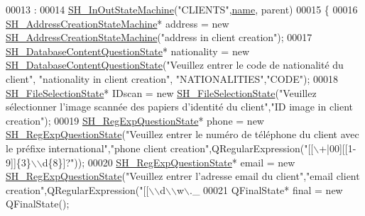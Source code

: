 \begin{DoxyCode}
00013                                                                                           :
00014     \hyperlink{classSH__InOutStateMachine_abd780037922920c674b43d80c2b50d16}{SH\_InOutStateMachine}(\textcolor{stringliteral}{"CLIENTS"},\hyperlink{classSH__NamedObject_a9f686c6f2a5bcc08ad03d0cee0151f0f}{name}, parent)
00015 \{
00016     \hyperlink{classSH__AddressCreationStateMachine}{SH\_AddressCreationStateMachine}* address = \textcolor{keyword}{new} 
      \hyperlink{classSH__AddressCreationStateMachine}{SH\_AddressCreationStateMachine}(\textcolor{stringliteral}{"address in client creation"});
00017     \hyperlink{classSH__DatabaseContentQuestionState}{SH\_DatabaseContentQuestionState}* nationality = \textcolor{keyword}{new} 
      \hyperlink{classSH__DatabaseContentQuestionState}{SH\_DatabaseContentQuestionState}(\textcolor{stringliteral}{"Veuillez entrer le code de nationalité du
       client"}, \textcolor{stringliteral}{"nationality in client creation"}, \textcolor{stringliteral}{"NATIONALITIES"},\textcolor{stringliteral}{"CODE"});
00018     \hyperlink{classSH__FileSelectionState}{SH\_FileSelectionState}* IDscan = \textcolor{keyword}{new} 
      \hyperlink{classSH__FileSelectionState}{SH\_FileSelectionState}(\textcolor{stringliteral}{"Veuillez sélectionner l'image scannée des papiers d'identité du
       client"},\textcolor{stringliteral}{"ID image in client creation"});
00019     \hyperlink{classSH__RegExpQuestionState}{SH\_RegExpQuestionState}* phone = \textcolor{keyword}{new} 
      \hyperlink{classSH__RegExpQuestionState}{SH\_RegExpQuestionState}(\textcolor{stringliteral}{"Veuillez entrer le numéro de téléphone du client avec le
       préfixe international"},\textcolor{stringliteral}{"phone client creation"},QRegularExpression(\textcolor{stringliteral}{"[[\(\backslash\)+|00][[1-9]]\{3\}\(\backslash\)\(\backslash\)d\{8\}]?"}));
00020     \hyperlink{classSH__RegExpQuestionState}{SH\_RegExpQuestionState}* email = \textcolor{keyword}{new} 
      \hyperlink{classSH__RegExpQuestionState}{SH\_RegExpQuestionState}(\textcolor{stringliteral}{"Veuillez entrer l'adresse email du client"},\textcolor{stringliteral}{"email client
       creation"},QRegularExpression(\textcolor{stringliteral}{"[[\(\backslash\)\(\backslash\)d\(\backslash\)\(\backslash\)w\(\backslash\).\_%
00021     QFinalState* \textcolor{keyword}{final} = \textcolor{keyword}{new} QFinalState();
}
\end{DoxyCode}
